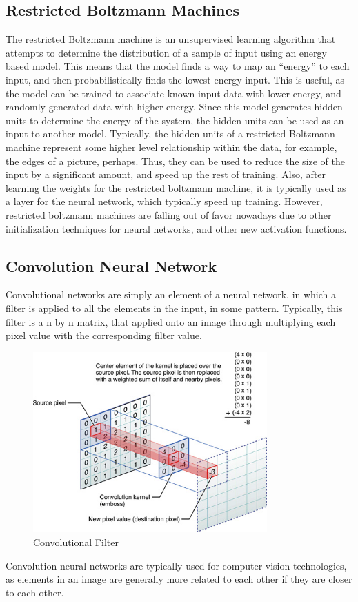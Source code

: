 \documentclass{article}
\begin{document}
\subsection{Restricted Boltzmann Machines}
The restricted Boltzmann machine is an unsupervised learning algorithm that
attempts to determine the distribution of a sample of input using an energy
based model. This means that the model finds a way to map an ``energy'' to each
input, and then probabilistically finds the lowest energy input. This is useful,
as the model can be trained to associate known input data with lower energy, and
randomly generated data with higher energy. Since this model generates hidden
units to determine the energy of the system, the hidden units can be used as an
input to another model. Typically, the hidden units of a restricted Boltzmann
machine represent some higher level relationship within the data, for example,
the edges of a picture, perhaps. Thus, they can be used to reduce the size of
the input by a significant amount, and speed up the rest of training. Also,
after learning the weights for the restricted boltzmann machine, it is typically
used as a layer for the neural network, which typically speed up training.
However, restricted boltzmann machines are falling out of favor nowadays due to
other initialization techniques for neural networks, and other new activation
functions.

\subsection{Convolution Neural Network}
Convolutional networks are simply an element of a neural network, in which a
filter is applied to all the elements in the input, in some pattern. Typically,
this filter is a n by n matrix, that applied onto an image through multiplying
each pixel value with the corresponding filter value. 
\begin{figure}[H]
	\centering
	\caption{Convolutional Filter}
	\includegraphics[width=0.8\textwidth]{convolutionFilter.jpg}
\end{figure}
Convolution neural networks are typically used for computer vision technologies,
as elements in an image are generally more related to each other if they are
closer to each other. 
\end{document}
